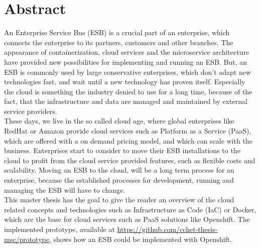 \chapter{Abstract}
An Enterprise Service Bus (ESB) is a crucial part of an enterprise, which connects the enterprise to its partners, customers and other branches. The appearance of containerization, cloud services and the microservice architecture have provided new possibilities for implementing and running an ESB. But, an ESB is commonly used by large conservative enterprises, which don't adapt new technologies fast, and wait until a new technology has proven itself. Especially the cloud is something the industry denied to use for a long time, because of the fact, that the infrastructure and data are managed and maintained by external service providers. \\ 

These days, we live in the so called cloud age, where global enterprises like RedHat or Amazon provide cloud services such as Platform as a Service (PaaS), which are offered with a on demand pricing model, and which can scale with the business. Enterprises start to consider to move their ESB installations to the cloud to profit from the cloud service provided features, such as flexible costs and scalability. Moving an ESB to the cloud, will be a long term process for an enterprise, because the established processes for development, running and managing the ESB will have to change. \\

This master thesis has the goal to give the reader an overview of the cloud related concepts and technologies such as Infrastructure as Code (IaC) or Docker, which are the base for cloud services such as PaaS solutions like Openshift. The implemented prototype, available at \url{https://github.com/cchet-thesis-msc/prototype}, shows how an ESB could be implemented with Openshift. \\


